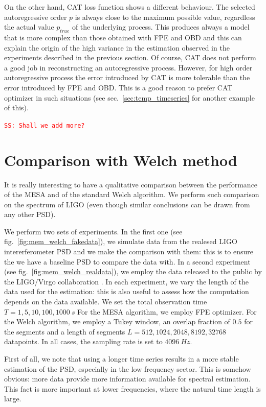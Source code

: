 \documentclass[twocolumn,showpacs,preprintnumbers,nofootinbib,prd,
superscriptaddress,10pt]{revtex4-1}
\newcommand{\sschmidt}[1]{{\textcolor{red}{\texttt{SS: #1}} }}
\begin{document}
On the other hand, CAT loss function shows a different behaviour. The selected autoregressive order $p$ is always close to the maximum possible value, regardless the actual value $p_{true}$ of the underlying process. This produces always a model that is more complex than those obtained with FPE and OBD and this can explain the origin of the high variance in the estimation observed in the experiments described in the previous section.
Of course, CAT does not perform a good job in reconstructing an autoregressive process. However, for high order autoregressive process the error introduced by CAT is more tolerable than the error introduced by FPE and OBD. This is a good reason to prefer CAT optimizer in such situations (see sec.~\ref{sec:temp_timeseries} for another example of this).

\sschmidt{Shall we add more?} 

\section{Comparison with Welch method}\label{sec:Welch_comparison}

It is really interesting to have a qualitative comparison between the performance of the MESA and of the standard Welch algorithm.
We perform such comparison on the spectrum of LIGO (even though similar conclusions can be drawn from any other PSD).

We perform two sets of experiments.
In the first one (see fig.~\ref{fig:mem_welch_fakedata}), we simulate data from the realesed LIGO intererferometer PSD and we make the comparison with them: this is to ensure the we have a baseline PSD to compare the data with.
In a second experiment (see fig.~\ref{fig:mem_welch_realdata}), we employ the data released to the public by the LIGO/Virgo collaboration \cite{Abbott_2021}.
In each experiment, we vary the length of the data used for the estimation: this is also useful to assess how the computation depends on the data available. We set the total observation time $T = 1, 5, 10, 100, 1000 \SI{}{s}$
For the MESA algorithm, we employ FPE optimizer. For the Welch algorithm, we employ a Tukey window, an overlap fraction of $0.5$ for the segments and a length of segments $L = 512, 1024, 2048, 8192, 32768$ datapoints.
In all cases, the sampling rate is set to $\SI{4096}{Hz}$.

First of all, we note that using a longer time series results in a more stable estimation of the PSD, especially in the low frequency sector. This is somehow obvious: more data provide more information available for spectral estimation. This fact is more important at lower frequencies, where the natural time length is large.
\end{document}
